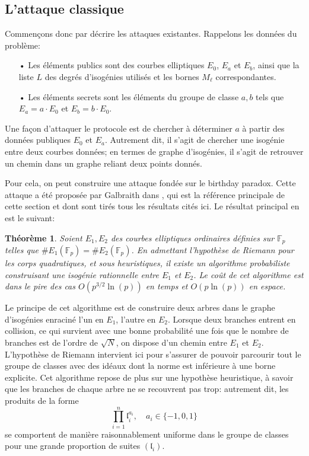 \documentclass[11pt,a4paper]{article}
\newcommand{\F}{\mathbb{F}}
\renewcommand{\frak}{\mathfrak}
\renewcommand{\v}{\vspace{5mm}}
\newtheorem*{thm}{Théorème}
\theoremstyle{definition}
\begin{document}
\subsection{L'attaque classique}


Commençons donc par décrire les attaques existantes. Rappelons les données du problème:
\begin{itemize}
\item[•] Les éléments publics sont des courbes elliptiques $E_0$, $E_a$ et $E_b$, ainsi que la liste $L$ des degrés d'isogénies utilisés et les bornes $M_\ell$ correspondantes.
\item[•] Les éléments secrets sont les éléments du groupe de classe $a, b$ tels que $E_a = a\cdot E_0$ et $E_b = b\cdot E_0$.
\end{itemize}

Une façon d'attaquer le protocole est de chercher à déterminer $a$ à partir des données publiques $E_0$ et $E_a$. Autrement dit, il s'agit de chercher une isogénie entre deux courbes données; en termes de graphe d'isogénies, il s'agit de retrouver un chemin dans un graphe reliant deux points donnés.

\v
Pour cela, on peut construire une attaque fondée sur le \og birthday paradox\fg. Cette attaque a été proposée par Galbraith dans \cite{Galbraith}, qui est la référence principale de cette section et dont sont tirés tous les résultats cités ici. Le résultat principal en est le suivant:

\begin{thm}
Soient $E_1, E_2$ des courbes elliptiques ordinaires définies sur $\F_p$ telles que $\#E_1(\F_p) = \#E_2(\F_p)$. En admettant l'hypothèse de Riemann pour les corps quadratiques, et sous heuristiques, il existe un algorithme probabiliste construisant une isogénie rationnelle entre $E_1$ et $E_2$. Le coût de cet algorithme est dans le pire des cas $O(p^{3/2}\ln(p))$ en temps et $O(p \ln(p))$ en espace.
\end{thm}

Le principe de cet algorithme est de construire deux arbres dans le graphe d'isogénies enraciné l'un en $E_1$, l'autre en $E_2$. Lorsque deux branches entrent en collision, ce qui survient avec une bonne probabilité une fois que le nombre de branches est de l'ordre de $\sqrt{N}$, on dispose d'un chemin entre $E_1$ et $E_2$. L'hypothèse de Riemann intervient ici pour s'assurer de pouvoir parcourir tout le groupe de classes avec des idéaux dont la norme est inférieure à une borne explicite. Cet algorithme repose de plus sur une hypothèse heuristique, à savoir que les branches de chaque arbre ne se recouvrent pas trop: autrement dit, les produits de la forme
$$\prod_{i = 1}^n {\frak l}_i^{a_i}, \quad a_i\in \{-1,0,1\}$$
se comportent de manière raisonnablement uniforme dans le groupe de classes pour une grande proportion de suites $({\frak l}_i)$.
\end{document}
